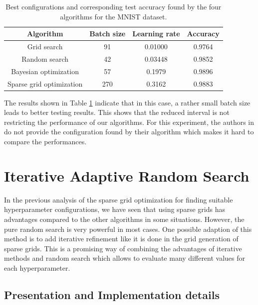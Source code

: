 \begin{table}[htbp!]
	\caption{ Best configurations and corresponding test accuracy found by the four algorithms for the MNIST dataset. }
	\label{tab:configs_MNIST_comp}
	\centering
	\begin{tabular}{| c c c c |} 
		\hline
		Algorithm & Batch size & Learning rate & Accuracy \\ 
		\hline
		Grid search & 91 & 0.01000 & 0.9764 \\ 
		Random search & 42 & 0.03448 & 0.9852 \\ 
		Bayesian optimization & 57 & 0.1979 & 0.9896 \\ 
		Sparse grid optimization & 270 & 0.3162 & 0.9883 \\ 
		\hline
	\end{tabular}
\end{table}

The results shown in Table \ref{tab:configs_MNIST_comp} indicate that in this case, a rather small batch size leads to better testing results. This shows that the reduced interval is not restricting the performance of our algorithms. For this experiment, the authors in \cite{WU201926} do not provide the configuration found by their algorithm which makes it hard to compare the performances. 


\section{Iterative Adaptive Random Search}

In the previous analysis of the sparse grid optimization for finding suitable hyperparameter configurations, we have seen that using sparse grids has advantages compared to the other algorithms in some situations. However, the pure random search is very powerful in most cases. One possible adaption of this method is to add iterative refinement like it is done in the grid generation of sparse grids. This is a promising way of combining the advantages of iterative methods and random search which allows to evaluate many different values for each hyperparameter. 

\subsection{Presentation and Implementation details}

